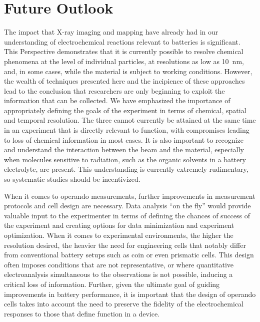 \documentclass[journal=cmatex,manuscript=perspective]{achemso}
\begin{document}
\section{Future Outlook}

The impact that X-ray imaging and mapping have already had in our
understanding of electrochemical reactions relevant to batteries is
significant. This Perspective demonstrates that it is currently
possible to resolve chemical phenomena at the level of individual
particles, at resolutions as low as \SI{10}{nm}, and, in some cases,
while the material is subject to working conditions. However, the
wealth of techniques presented here and the incipience of these
approaches lead to the conclusion that researchers are only beginning
to exploit the information that can be collected. We have emphasized
the importance of appropriately defining the goals of the experiment
in terms of chemical, spatial and temporal resolution. The three
cannot currently be attained at the same time in an experiment that is
directly relevant to function, with compromises leading to loss of
chemical information in most cases. It is also important to recognize
and understand the interaction between the beam and the material,
especially when molecules sensitive to radiation, such as the organic
solvents in a battery electrolyte, are present. This understanding is
currently extremely rudimentary, so systematic studies should be
incentivized.

When it comes to operando measurements, further improvements in
measurement protocols and cell design are necessary. Data analysis
``on the fly'' would provide valuable input to the experimenter in
terms of defining the chances of success of the experiment and
creating options for data minimization and experiment
optimization. When it comes to experimental environments, the higher
the resolution desired, the heavier the need for engineering cells
that notably differ from conventional battery setups such as coin or
even prismatic cells. This design often imposes conditions that are
not representative, or where quantitative electroanalysis simultaneous
to the observations is not possible, inducing a critical loss of
information. Further, given the ultimate goal of guiding improvements
in battery performance, it is important that the design of operando
cells takes into account the need to preserve the fidelity of the
electrochemical responses to those that define function in a device.
\end{document}
